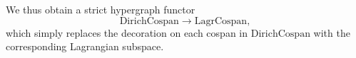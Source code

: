 We thus obtain a strict hypergraph functor 
\[   
\mathrm{DirichCospan} \to \mathrm{LagrCospan},
\]
which simply replaces the decoration on each cospan in $\mathrm{DirichCospan}$
with the corresponding Lagrangian subspace.



